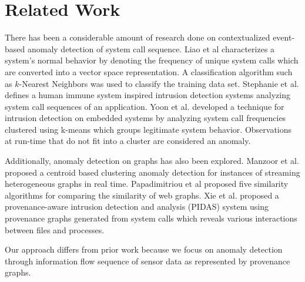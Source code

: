 %

%
%


\section{Related Work}

There has been a considerable amount of research done on contextualized event-based anomaly detection of system call sequence. Liao et al \cite{liao_using_2002} characterizes a system's normal behavior by denoting the frequency of unique system calls which are converted into a vector space representation. A classification algorithm such as $k$-Nearest Neighbors was used to classify the training data set. Stephanie et al. \cite{Hofmeyr} defines a human immune system inspired intrusion detection systems analyzing system call sequences of an application. Yoon et al. \cite{Yoon} developed a technique for intrusion detection on embedded systems by analyzing system call frequencies clustered using k-means which groups legitimate system behavior. Observations at run-time that do  not fit into a cluster are considered an anomaly. 
\par Additionally, anomaly detection on graphs has also been explored. Manzoor et al. \cite{manzoor_fast_2016} proposed a centroid based clustering anomaly detection for instances of streaming heterogeneous graphs in real time. Papadimitriou et al \cite{Papadimitriou2010} proposed five similarity algorithms for comparing the similarity of web graphs. Xie et al. \cite{Xie:2016:UID:2936026.2936232} proposed a provenance-aware intrusion detection and analysis (PIDAS) system using provenance graphs generated from system calls which reveals various interactions between files and processes. 
\par Our approach differs from prior work because we focus on anomaly detection through information flow sequence of sensor data as represented by provenance graphs. 


